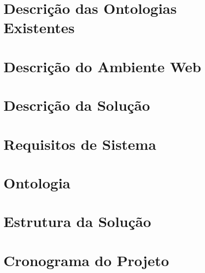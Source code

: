 % 

\section{Descrição das Ontologias Existentes} %
\label{sec:introdu_o}
 

\section{Descrição do Ambiente Web} %
\label{sec:introdu_o}
 

\section{Descrição da Solução} %
\label{sec:solucao}
 

\section{Requisitos de Sistema}
\label{sec:requisitos}


\section{Ontologia} %
\label{sec:ontologia}


\section{Estrutura da Solução} %
\label{sec:estrutura_da_solu_o}


\section{Cronograma do Projeto} %
\label{sec:produtos}
 
